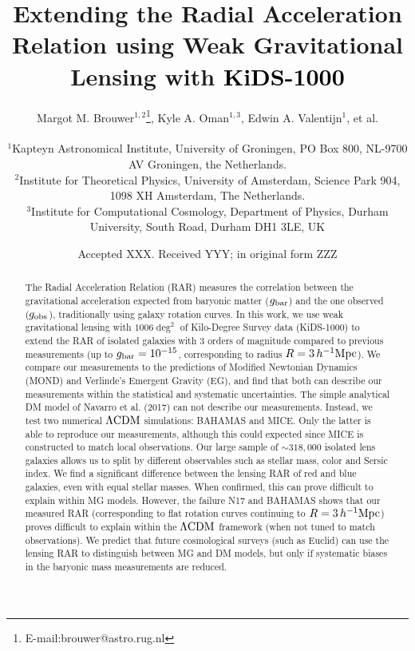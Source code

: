 \documentclass[usenatbib]{mnras}
\title[Extending the RAR using weak lensing with KiDS-1000]{Extending the Radial Acceleration Relation using Weak Gravitational Lensing with \textcolor{black}{KiDS-1000}}
\author[M. M. Brouwer et al.]{Margot M. Brouwer$^{1,2}$\thanks{E-mail:brouwer@astro.rug.nl}, Kyle A. Oman$^{1,3}$, Edwin A. Valentijn$^{1}$, et al.
	\\
	\\
	$^{1}$Kapteyn Astronomical Institute, University of Groningen, PO Box 800, NL-9700 AV Groningen, the Netherlands.\\
	$^{2}$Institute for Theoretical Physics, University of Amsterdam, Science Park 904, 1098 XH Amsterdam, The Netherlands. \\
    $^{3}$Institute for Computational Cosmology, Department of Physics, Durham University, South Road, Durham DH1 3LE, UK \\
}
\date{Accepted XXX. Received YYY; in original form ZZZ}
\newcommand{\hMpc}{\, h^{-1}{\rm{Mpc}} }
\newcommand{\lcdm}{{\rm \Lambda CDM}}
\newcommand{\un}[1]{_{\rm #1}}
\begin{document}
\label{firstpage}
\pagerange{\pageref{firstpage}--\pageref{lastpage}}
\maketitle

\begin{abstract}
The Radial Acceleration Relation (RAR) measures the correlation between the gravitational acceleration expected from baryonic matter ($g\un{bar}$) and the one observed ($g\un{obs}$), traditionally using galaxy rotation curves.  In this work, we use weak gravitational lensing with $1006 \deg^2$ of Kilo-Degree Survey data (KiDS-1000) to extend the RAR of isolated galaxies with $3$ orders of magnitude compared to previous measurements (up to $g\un{bar}=10^{-15}$, corresponding to radius $R=3\hMpc$). We compare our measurements to the predictions of Modified Newtonian Dynamics (MOND) and Verlinde's Emergent Gravity (EG), and find that both can describe our measurements within the statistical and systematic uncertainties. The simple analytical DM model of Navarro et al. (2017) can not describe our measurements. Instead, we test two numerical $\lcdm$ simulations: BAHAMAS and MICE. Only the latter is able to reproduce our measurements, although this could expected since MICE is constructed to match local observations. Our large sample of $\sim318,000$ isolated lens galaxies allows us to split by different observables such as stellar mass, color and Sersic index. We find a significant difference between the lensing RAR of red and blue galaxies, even with equal stellar masses. When confirmed, this can prove difficult to explain within MG models. However, the failure N17 and BAHAMAS shows that our measured RAR (corresponding to flat rotation curves continuing to $R=3\hMpc$) proves difficult to explain within the $\lcdm$ framework (when not tuned to match observations). We predict that future cosmological surveys (such as Euclid) can use the lensing RAR to distinguish between MG and DM models, but only if systematic biases in the baryonic mass measurements are reduced.
\end{abstract}
\end{document}
